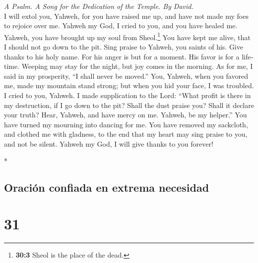\begin{paracol}{2}
\begin{otherlanguage}{english}
\emph{A Psalm. A Song for the Dedication of the Temple. By David.}\\
 I will extol you, Yahweh, for you have raised me up, and
have not made my foes to rejoice over me.  Yahweh my God,
I cried to you, and you have healed me.  Yahweh, you have
brought up my soul from Sheol.\footnote{\textbf{30:3} Sheol is the place
  of the dead.} You have kept me alive, that I should not go down to the
pit.  Sing praise to Yahweh, you saints of his. Give
thanks to his holy name.  For his anger is but for a
moment. His favor is for a lifetime. Weeping may stay for the night, but
joy comes in the morning.  As for me, I said in my
prosperity, ``I shall never be moved.''  You, Yahweh, when
you favored me, made my mountain stand strong; but when you hid your
face, I was troubled.  I cried to you, Yahweh. I made
supplication to the Lord:  ``What profit is there in my
destruction, if I go down to the pit? Shall the dust praise you? Shall
it declare your truth?  Hear, Yahweh, and have mercy on
me. Yahweh, be my helper.''  You have turned my mourning
into dancing for me. You have removed my sackcloth, and clothed me with
gladness,  to the end that my heart may sing praise to
you, and not be silent. Yahweh my God, I will give thanks to you
forever!

\end{otherlanguage}

\switchcolumn[0]*

\hypertarget{oraciuxf3n-confiada-en-extrema-necesidad}{%
\subsection{Oración confiada en extrema
necesidad}\label{oraciuxf3n-confiada-en-extrema-necesidad}}

\hypertarget{section-60}{%
\section{31}\label{section-60}}


\end{paracol}
